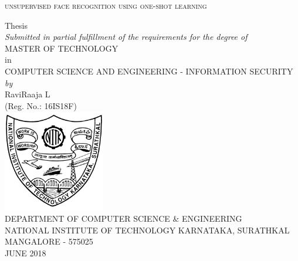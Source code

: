 \documentclass[a4paper,12pt, twoside]{NITKReport}
\let\oldemph\emph
\renewcommand\emph[1]{{\fontsize{13pt}{14pt}\selectfont\oldemph{#1}}}
\begin{document}
	
	
	\newcommand{\thesistitle}{Unsupervised Face Recognition Using One-Shot Learning}
	\newcommand\textlcsc[1]{\textsc{\MakeLowercase{#1}}}
	\newcommand{\regno}{16IS18F}
	\newcommand{\authorname}{RaviRaaja L}
	
	
	
	
	
	\begin{titlepage}
		\begin{center}
			{\textlcsc{\LARGE \thesistitle}}\\
			\vspace{20.5pt}
			
			
			Thesis\\
			\vspace{10pt}
			{\emph {Submitted in partial fulfillment of the requirements for the degree of}} \\
			\vspace{20pt}
			{\Large MASTER OF TECHNOLOGY}\\
			\vspace{10pt}
			in\\
			\vspace{10pt}
			{ \Large COMPUTER SCIENCE AND ENGINEERING - INFORMATION SECURITY}\\
			\vspace{25pt}
			\textit {by} \\
			\vspace{10pt}
			{\Large RaviRaaja L}\\ 
			{(Reg. No.: \regno)}\\
			\vspace{1CM}
			\includegraphics*[height=1.75in,width=1.75in]{NITK-Emblem.png}\\
			\vspace{1cm}
			\MakeUppercase{{\large Department of Computer Science \& Engineering}}\\
			\vspace{0.2cm}
			\MakeUppercase{{\large National Institute of Technology Karnataka, Surathkal}}\\
			\vspace{0.2cm}
			\MakeUppercase{{\large Mangalore - 575025}}\\
			\vspace{.2cm}
			\MakeUppercase{{\large JUNE 2018}}\\
		\end{center}
	\end{titlepage}
	
\end{document}
